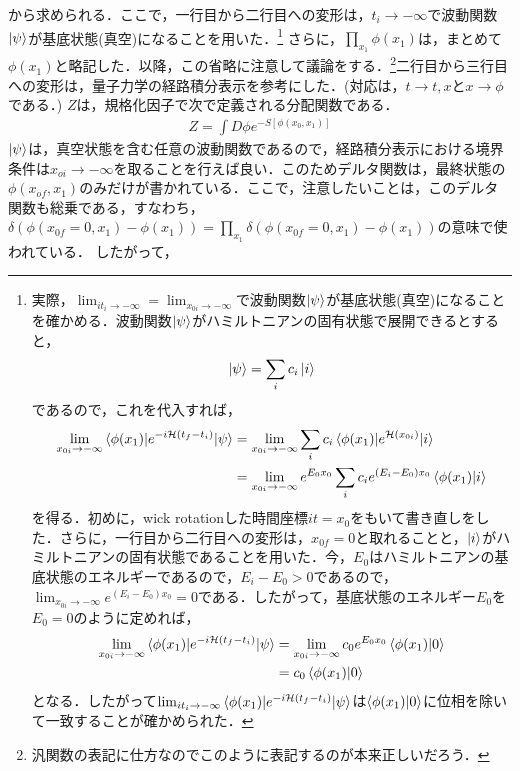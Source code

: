 から求められる．ここで，一行目から二行目への変形は，$t_i\to -\infty$で波動関数$\ket{\psi}$が基底状態(真空)になることを用いた．\footnote{実際，$\lim_{it_i\to -\infty}=\lim_{x_{0i}\to -\infty}$で波動関数$\ket{\psi}$が基底状態(真空)になることを確かめる．波動関数$\ket{\psi}$がハミルトニアンの固有状態で展開できるとすると，
\begin{align}
  \ket{\psi}=\sum_{i}c_{i}\ket{i}
\end{align}
であるので，これを代入すれば，
\begin{align}
  \lim_{x_{0i}\to -\infty}\braket{\phi(x_1)|e^{-i\mathcal
  {H}(t_f-t_i)}|\psi}&=\lim_{x_{0i}\to -\infty}\sum_{i}c_{i}\braket{\phi(x_1)|e^{\mathcal
  {H}(x_{0i})}|i}\\
  &=\lim_{x_{0i}\to -\infty}e^{E_0x_0}\sum_{i}c_{i}e^{(E_i-E_0)x_0}\braket{\phi(x_1)|i}
\end{align}
を得る．初めに，wick rotationした時間座標$it=x_0$をもいて書き直しをした．さらに，一行目から二行目への変形は，$x_{0f}=0$と取れることと，$\ket{i}$がハミルトニアンの固有状態であることを用いた．今，$E_0$はハミルトニアンの基底状態のエネルギーであるので，$E_{i}-E_0>0$であるので，$\lim_{x_{0i} \to -\infty}e^{(E_i-E_0)x_0}=0$である．したがって，基底状態のエネルギー$E_0$を$E_0=0$のように定めれば，
\begin{align}
  \lim_{x_{0i}\to -\infty}\braket{\phi(x_1)|e^{-i\mathcal
  {H}(t_f-t_i)}|\psi}&=\lim_{x_{0i}\to -\infty}c_0e^{E_0x_0}\braket{\phi(x_1)|0}\\
  &=c_0\braket{\phi(x_1)|0}
\end{align}
となる．したがって$\lim_{it_i\to -\infty}\braket{\phi(x_1)|e^{-i\mathcal
{H}(t_f-t_i)}|\psi}$は$\braket{\phi(x_1)|0}$に位相を除いて一致することが確かめられた．}
さらに，$\prod_{x_1}\phi(x_1)$は，まとめて$\phi(x_1)$と略記した．以降，この省略に注意して議論をする．\footnote{汎関数の表記に仕方なのでこのように表記するのが本来正しいだろう．}二行目から三行目への変形は，量子力学の経路積分表示を参考にした．(対応は，$t\rightarrow t,x$と$x\rightarrow \phi$である．)
$Z$は，規格化因子で次で定義される分配関数である．
\begin{align}
  Z=\int D\phi e^{-S[\phi(x_0,x_1)]}
\end{align}
$\ket{\psi}$は，真空状態を含む任意の波動関数であるので，経路積分表示における境界条件は$x_{oi}\to -\infty$を取ることを行えば良い．このためデルタ関数は，最終状態の$\phi(x_{of},x_1)$のみだけが書かれている．ここで，注意したいことは，このデルタ関数も総乗である，すなわち，
$\delta(\phi(x_{0f}=0,x_1)-\phi(x_1))=\prod_{x_1}\delta(\phi(x_{0f}=0,x_1)-\phi(x_1))$の意味で使われている． したがって，
